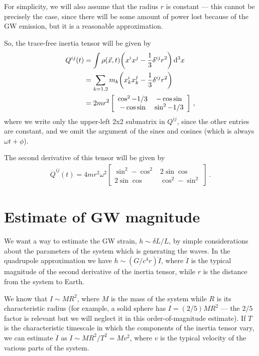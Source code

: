 \documentclass[main.tex]{subfiles}
\begin{document}
For simplicity, we will also assume that the radius \(r\) is constant --- this cannot be precisely the case, since there will be some amount of power lost because of the GW emission, but it is a reasonable approximation.

So, the trace-free inertia tensor will be given by 
%
\begin{align}
Q^{ij} (t) &= \int \rho (\vec{x}, t) \qty( x^{i} x^{j} - \frac{1}{3} \delta^{ij} r^2) \dd[3]{x}  \\
&= \sum _{k=1, 2} m_k \qty(x_k^{i} x_k^{j} - \frac{1}{3} \delta^{ij} r^2)  \\
&= 2 m r^2 \left[\begin{array}{cc}
\cos^2 - 1/3 & - \cos \sin \\ 
- \cos \sin & \sin^2 - 1/3  
\end{array}\right] 
\,,
\end{align}
%
where we write only the upper-left 2x2 submatrix in \(Q^{ij}\), since the other entries are constant, and we omit the argument of the sines and cosines (which is always \(\omega t + \phi \)). 

The second derivative of this tensor will be given by 
%
\begin{align}
\ddot{Q}^{ij}(t) = 4 m r^2 \omega^2 \left[\begin{array}{cc}
\sin^2 - \cos^2 & 2 \sin \cos \\ 
2 \sin \cos & \cos^2 - \sin^2
\end{array}\right]
\,.
\end{align}

\section{Estimate of GW magnitude}

We want a way to estimate the GW strain, \(h \sim \delta L / L\), by simple considerations about the parameters of the system which is generating the waves. 
In the quadrupole approximation we have \(h \sim (G / c^{4} r) \ddot{I}\), where \(\ddot{I}\) is the typical magnitude of the second derivative of the inertia tensor, while \(r\) is the distance from the system to Earth. 

We know that \(I \sim M R^2\), where \(M\) is the mass of the system while \(R\) is its characteristic radius (for example, a solid sphere has \(I = (2/5)  M R^2 \) --- the \(2/5\) factor is relevant but we will neglect it in this order-of-magnitude estimate).
If \(T\) is the characteristic timescale in which the components of the inertia tensor vary, we can estimate \(\ddot{I}\) as \(\ddot{I} \sim M R^2 / T^2 = M v^2\), where \(v\) is the typical velocity of the various parts of the system. 
\end{document}
